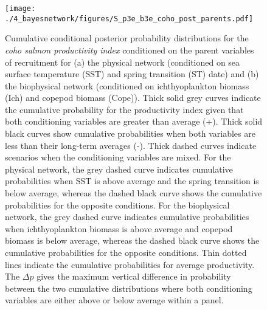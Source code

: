 \begin{figure}[htbp]
  \centering \texttt{[image: ./4\_bayesnetwork/figures/S\_p3e\_b3e\_coho\_post\_parents.pdf]}
  \caption{Cumulative conditional posterior probability distributions for the
    \emph{coho salmon productivity index} conditioned on the parent variables of
    recruitment for (a) the physical network (conditioned on sea surface
    temperature (SST) and spring transition (ST) date) and (b) the biophysical
    network (conditioned on ichthyoplankton biomass (Ich) and copepod biomass
    (Cope)). Thick solid grey curves indicate the cumulative probability for the
    productivity index given that both conditioning variables are greater than
    average (+). Thick solid black curves show cumulative probabilities when
    both variables are less than their long-term averages (-). Thick dashed
    curves indicate scenarios when the conditioning variables are mixed. For the
    physical network, the grey dashed curve indicates cumulative probabilities
    when SST is above average and the spring transition is below average,
    whereas the dashed black curve shows the cumulative probabilities for the
    opposite conditions. For the biophysical network, the grey dashed curve
    indicates cumulative probabilities when ichthyoplankton biomass is above
    average and copepod biomass is below average, whereas the dashed black curve
    shows the cumulative probabilities for the opposite conditions.  Thin dotted
    lines indicate the cumulative probabilities for average productivity. The
    \(\Delta p\) gives the maximum vertical difference in probability between
    the two cumulative distributions where both conditioning variables are
    either above or below average within a panel.} 
  \label{fig:bn:s4}
\end{figure}
